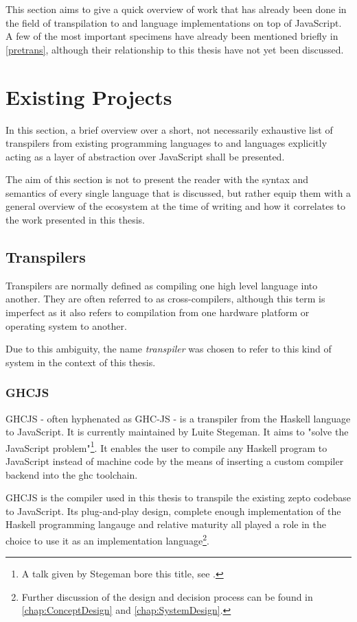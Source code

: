 \documentclass[oneside,11pt,xetex]{scrbook}
\begin{document}
This section aims to give a quick overview of work that has already been done in the
field of transpilation to and language implementations on top of JavaScript. A few
of the most important specimens have already been mentioned briefly in \ref{pretrans},
although their relationship to this thesis have not yet been discussed.

\section{Existing Projects}

In this section, a brief overview over a short, not necessarily exhaustive list of
transpilers from existing programming languages to and languages explicitly
acting as a layer of abstraction over JavaScript shall be presented.

The aim of this section is not to present the reader with the syntax and semantics
of every single language that is discussed, but rather equip them with a general
overview of the ecosystem at the time of writing and how it correlates to the
work presented in this thesis.

\subsection{Transpilers}
\label{trans}

Transpilers are normally defined as compiling one high level language into another.
They are often referred to as cross-compilers, although this term is imperfect as
it also refers to compilation from one hardware platform or operating system to
another.

Due to this ambiguity, the name \textit{transpiler} was chosen to refer to this
kind of system in the context of this thesis.

\subsubsection{GHCJS}
\label{sec:GHCJS}

GHCJS - often hyphenated as GHC-JS - is a transpiler from the Haskell language
to JavaScript. It is currently maintained by Luite Stegeman. It aims to "solve
the JavaScript problem"\footnote{A talk given by Stegeman bore this title, see
\parencite{STEG}.}. It enables the user to compile any Haskell program to JavaScript
instead of machine code by the means of inserting a custom compiler backend into
the \gls{ghc} toolchain.

GHCJS is the compiler used in this thesis to transpile the existing zepto codebase
to JavaScript. Its plug-and-play design, complete enough implementation of the
Haskell programming langauge and relative maturity all played a role in the choice
to use it as an implementation language\footnote{Further discussion of the design
and decision process can be found in \ref{chap:ConceptDesign} and
\ref{chap:SystemDesign}.}.
\end{document}
